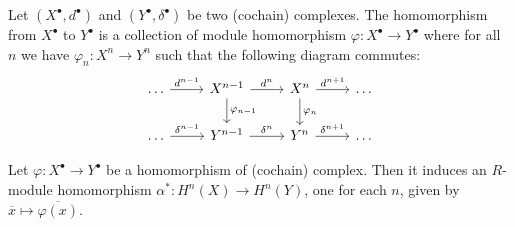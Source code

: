 \medskip

\begin{defn} 
    Let $(X^\bullet, d^\bullet)$ and $(Y^\bullet, \delta^\bullet)$ be two (cochain) complexes. The homomorphism from $X^\bullet$ to $Y^\bullet$ is a collection of module homomorphism $\varphi:X^\bullet \to Y^\bullet$ where for all $n$ we have $\varphi_n:X^n \to Y^n$ such that the following diagram commutes:
    \[\begin{tikzcd} [sep = small]
	\dots && {X^{n-1}} && {X^{n}} && \dots \\
	\\
	\dots && {Y^{n-1}} && {Y^n} && \dots
	\arrow["{d^{n-1}}", from=1-1, to=1-3]
	\arrow["{d^{n}}", from=1-3, to=1-5]
	\arrow["{\varphi_{n-1}}", from=1-3, to=3-3]
	\arrow["{d^{n+1}}", from=1-5, to=1-7]
	\arrow["{\varphi_{n}}", from=1-5, to=3-5]
	\arrow["{\delta^{n-1}}", from=3-1, to=3-3]
	\arrow["{\delta^{n}}", from=3-3, to=3-5]
	\arrow["{\delta^{n+1}}", from=3-5, to=3-7]
    \end{tikzcd}\]
\end{defn}

\medskip

\begin{pro}
    Let $\varphi:X^\bullet \to Y^\bullet$ be a homomorphism of (cochain) complex. Then it induces an $R$-module homomorphism $\alpha^*:H^n(X) \to H^n(Y)$, one for each $n$, given by $\overline x \mapsto \overline {\varphi(x)}$.
\end{pro}

